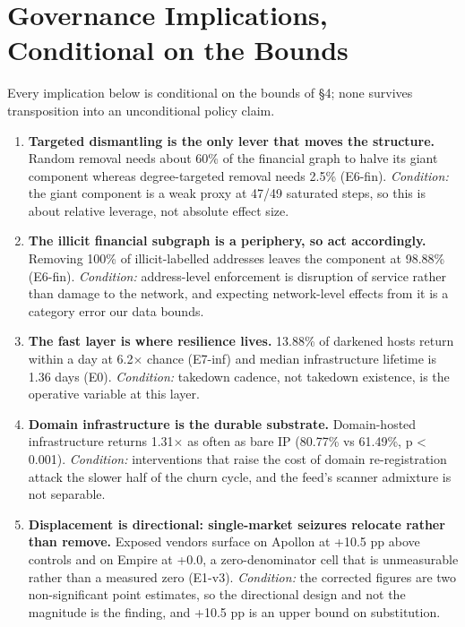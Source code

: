 \section{Governance Implications, Conditional on the Bounds}

Every implication below is conditional on the bounds of \S4; none survives
transposition into an unconditional policy claim.

\begin{enumerate}\itemsep1pt
\item \textbf{Targeted dismantling is the only lever that moves the structure.}
Random removal needs about 60\% of the financial graph to halve its giant
component whereas degree-targeted removal needs 2.5\% (E6-fin). \emph{Condition:}
the giant component is a weak proxy at 47/49 saturated steps, so this is about
relative leverage, not absolute effect size.
\item \textbf{The illicit financial subgraph is a periphery, so act accordingly.}
Removing 100\% of illicit-labelled addresses leaves the component at 98.88\%
(E6-fin). \emph{Condition:} address-level enforcement is disruption of service
rather than damage to the network, and expecting network-level effects from it
is a category error our data bounds.
\item \textbf{The fast layer is where resilience lives.} 13.88\% of darkened
hosts return within a day at 6.2$\times$ chance (E7-inf) and median
infrastructure lifetime is 1.36 days (E0). \emph{Condition:} takedown cadence,
not takedown existence, is the operative variable at this layer.
\item \textbf{Domain infrastructure is the durable substrate.} Domain-hosted
infrastructure returns 1.31$\times$ as often as bare IP (80.77\% vs 61.49\%,
p \textless{} 0.001). \emph{Condition:} interventions that raise the cost of
domain re-registration attack the slower half of the churn cycle, and the feed's
scanner admixture is not separable.
\item \textbf{Displacement is directional: single-market seizures relocate rather
than remove.} Exposed vendors surface on Apollon at +10.5 pp above controls and
on Empire at +0.0, a zero-denominator cell that is unmeasurable rather than a
measured zero (E1-v3). \emph{Condition:} the corrected figures are two
non-significant point estimates, so the directional design and not the magnitude
is the finding, and +10.5 pp is an upper bound on substitution.
\end{enumerate}

